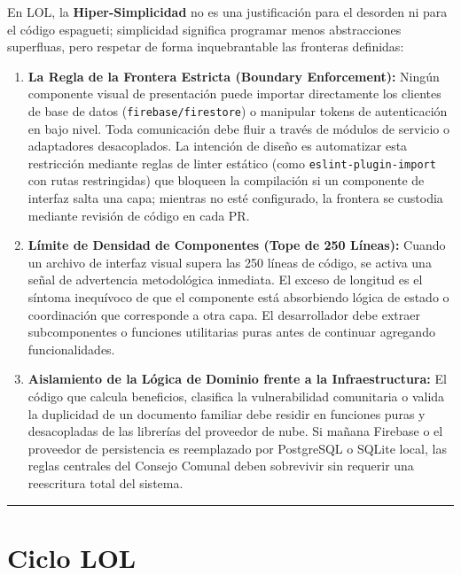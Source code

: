 \documentclass[14pt,a4paper,oneside]{extbook}
\begin{document}
En LOL, la \textbf{Hiper-Simplicidad} no es una justificación para el desorden ni para el código espagueti; simplicidad significa programar menos abstracciones superfluas, pero respetar de forma inquebrantable las fronteras definidas:

\begin{enumerate}
    \item \textbf{La Regla de la Frontera Estricta (Boundary Enforcement):} Ningún componente visual de presentación puede importar directamente los clientes de base de datos (\texttt{firebase/firestore}) o manipular tokens de autenticación en bajo nivel. Toda comunicación debe fluir a través de módulos de servicio o adaptadores desacoplados. La intención de diseño es automatizar esta restricción mediante reglas de linter estático (como \texttt{eslint-plugin-import} con rutas restringidas) que bloqueen la compilación si un componente de interfaz salta una capa; mientras no esté configurado, la frontera se custodia mediante revisión de código en cada PR.
    \item \textbf{Límite de Densidad de Componentes (Tope de 250 Líneas):} Cuando un archivo de interfaz visual supera las 250 líneas de código, se activa una señal de advertencia metodológica inmediata. El exceso de longitud es el síntoma inequívoco de que el componente está absorbiendo lógica de estado o coordinación que corresponde a otra capa. El desarrollador debe extraer subcomponentes o funciones utilitarias puras antes de continuar agregando funcionalidades.
    \item \textbf{Aislamiento de la Lógica de Dominio frente a la Infraestructura:} El código que calcula beneficios, clasifica la vulnerabilidad comunitaria o valida la duplicidad de un documento familiar debe residir en funciones puras y desacopladas de las librerías del proveedor de nube. Si mañana Firebase o el proveedor de persistencia es reemplazado por PostgreSQL o SQLite local, las reglas centrales del Consejo Comunal deben sobrevivir sin requerir una reescritura total del sistema.
\end{enumerate}

\par\vspace{1.5em}\noindent\hfill\rule{0.25\textwidth}{0.6pt}\hfill\par\vspace{1.5em}

\section{Ciclo LOL}
\end{document}
